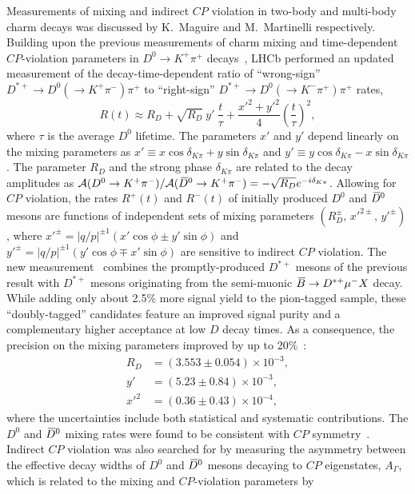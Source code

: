 \documentclass{PoS}
\newcommand{\CP}{{\ensuremath{C\!P}}\xspace}
\newcommand{\Dz}{\ensuremath{D^0}\xspace}
\def\Dbar{{\kern 0.2em\overline{\kern -0.2em\ensuremath{D}}{}}\xspace}
\newcommand{\Dzb}{\ensuremath{\Dbar{}^0}\xspace}
\def\Bbar{{\ensuremath{\kern 0.18em\overline{\kern -0.18em \ensuremath{B}}{}}}\xspace}
\begin{document}
Measurements of mixing and indirect \CP violation in two-body and multi-body charm decays was discussed by K.~Maguire and M.~Martinelli respectively.  Building upon the previous measurements of charm mixing and time-dependent \CP-violation parameters in $D^0\to K^+\pi^+$ decays~\cite{LHCb-PAPER-2013-053}, LHCb performed an updated measurement of the decay-time-dependent ratio of ``wrong-sign'' $D^{*+}\to\Dz(\to K^+\pi^-)\pi^+$ to ``right-sign'' $D^{*+}\to\Dz(\to K^-\pi^+)\pi^+$ rates,
\begin{equation}
R(t) \approx R_D+\sqrt{R_D}\ y'\ \frac{t}{\tau}+\frac{x'^2+y'^2}{4}\left(\frac{t}{\tau}\right)^2,
\end{equation}
where $\tau$ is the average \Dz lifetime. The parameters $x'$ and $y'$ depend linearly on the mixing parameters as $x' \equiv x\cos\delta_{K\pi}+y\sin\delta_{K\pi}$ and $y' \equiv y\cos\delta_{K\pi}-x\sin\delta_{K\pi}$. The parameter $R_D$ and the strong phase $\delta_{K\pi}$ are related to the decay amplitudes as $\mathcal{A}(\Dz\to K^+\pi^-)/\mathcal{A}(\Dzb\to K^+\pi^-) = -\sqrt{R_D} e^{-i\delta_{K\pi}}$. Allowing for \CP violation, the rates $R^+(t)$ and $R^-(t)$ of initially produced \Dz and \Dzb mesons are functions of independent sets of mixing parameters $(R_D^\pm,\, x'^{2\pm},\, y'^\pm)$, where $x'^\pm = |q/p|^{\pm 1}(x'\cos\phi \pm y'\sin\phi)$ and $y'^\pm = |q/p|^{\pm 1}(y'\cos\phi \mp x'\sin\phi)$ are sensitive to indirect \CP violation. The new measurement~\cite{LHCb-PAPER-2016-033} combines the promptly-produced $D^{*+}$ mesons of the previous result with $D^{*+}$ mesons originating from the semi-muonic $\Bbar\to D^{*+}\mu^-X$ decay. While adding only about 2.5\% more signal yield to the pion-tagged sample, these ``doubly-tagged'' candidates feature an improved signal purity and a complementary higher acceptance at low $D$ decay times. As a consequence, the precision on the mixing parameters improved by up to 20\%~\cite{LHCb-PAPER-2016-033}:
\begin{align*}
R_D &= \left(3.553\pm0.054\right)\times10^{-3},\\
y' &= \left(5.23\pm0.84\right)\times10^{-3},\\
x'^2 &= \left(0.36\pm0.43\right)\times10^{-4},
\end{align*}
where the uncertainties include both statistical and systematic contributions. The \Dz and \Dzb mixing rates were found to be consistent with \CP symmetry~\cite{LHCb-PAPER-2016-033}. Indirect \CP violation was also searched for by measuring the asymmetry between the effective decay widths of \Dz and \Dzb mesons decaying to \CP eigenstates, $A_\Gamma$, which is related to the mixing and \CP-violation parameters by
\end{document}
